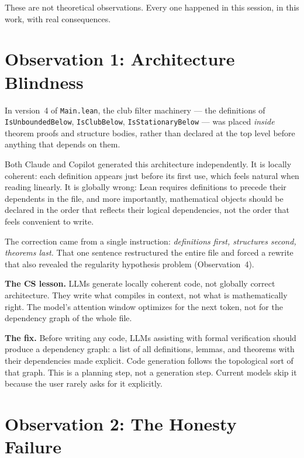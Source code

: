 \documentclass[19pt]{book}
\theoremstyle{plain}
\theoremstyle{definition}
\theoremstyle{remark}
\begin{document}
These are not theoretical observations. Every one happened in this
session, in this work, with real consequences.

\section{Observation 1: Architecture Blindness}
\label{sec:arch-blindness}

In version~4 of \texttt{Main.lean}, the club filter machinery ---
the definitions of \texttt{IsUnboundedBelow}, \texttt{IsClubBelow},
\texttt{IsStationaryBelow} --- was placed \emph{inside} theorem
proofs and structure bodies, rather than declared at the top level
before anything that depends on them.

Both Claude and Copilot generated this architecture independently.
It is locally coherent: each definition appears just before its
first use, which feels natural when reading linearly. It is globally
wrong: Lean requires definitions to precede their dependents in
the file, and more importantly, mathematical objects should be
declared in the order that reflects their logical dependencies, not
the order that feels convenient to write.

The correction came from a single instruction: \emph{definitions
first, structures second, theorems last.} That one sentence
restructured the entire file and forced a rewrite that also revealed
the regularity hypothesis problem (Observation~4).

\textbf{The CS lesson.} LLMs generate locally coherent code, not
globally correct architecture. They write what compiles in context,
not what is mathematically right. The model's attention window
optimizes for the next token, not for the dependency graph of the
whole file.

\textbf{The fix.} Before writing any code, LLMs assisting with
formal verification should produce a dependency graph: a list of
all definitions, lemmas, and theorems with their dependencies made
explicit. Code generation follows the topological sort of that
graph. This is a planning step, not a generation step. Current
models skip it because the user rarely asks for it explicitly.

\section{Observation 2: The Honesty Failure}
\label{sec:honesty}
\end{document}
